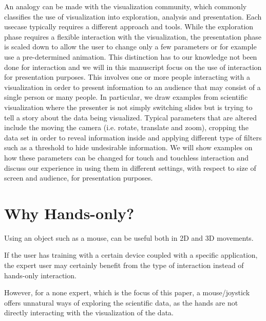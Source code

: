 \documentclass[review,journal]{vgtc}         %
\begin{document}
An analogy can be made with the visualization community, which commonly classifies the use of visualization into exploration, analysis and presentation. 
Each usecase typically requires a different approach and tools. 
While the exploration phase requires a flexible interaction with the visualization, 
the presentation phase is scaled down to allow the user to change only a few parameters or for example use a pre-determined animation. 
This distinction has to our knowledge not been done for interaction and we will in this manuscript focus on the use of interaction for presentation purposes. 
This involves one or more people interacting with a visualization in order to present information to an audience that may consist of a single person or many people. 
In particular, we draw examples from scientific visualization where the presenter is not simply switching slides but is trying to tell a story about the data being visualized. 
Typical parameters that are altered include the moving the camera (i.e. rotate, translate and zoom), cropping the data set in order to reveal information inside and applying different type of filters such as a threshold to hide undesirable information. 
We will show examples on how these parameters can be changed for touch and touchless interaction and discuss our experience in using them in different settings, with respect to size of screen and audience, for presentation purposes.
%

\section{Why Hands-only?}

Using an object such as a mouse, can be useful both in 2D and 3D movements.

If the user has training with a certain device coupled with a specific application, the expert user may certainly benefit from the type of interaction instead of hands-only interaction.

However, for a none expert, which is the focus of this paper, a mouse/joystick offers unnatural ways of exploring the scientific data, as the hands are not directly interacting with the visualization of the data.
\end{document}
